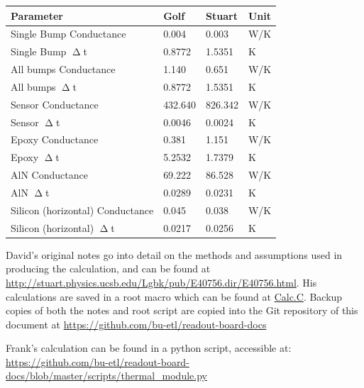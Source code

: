 \documentclass[11pt]{article}
\begin{document}
\begin{center}
  \begin{tabular}{llll}
    \textbf{Parameter}               & \textbf{Golf} & \textbf{Stuart} & \textbf{Unit} \\\midrule
    Single Bump Conductance          & 0.004         & 0.003           & W/K           \\
    Single Bump $\upDelta$t          & 0.8772        & 1.5351          & K             \\
    All bumps Conductance            & 1.140         & 0.651           & W/K           \\
    All bumps $\upDelta$t            & 0.8772        & 1.5351          & K             \\
    Sensor Conductance               & 432.640       & 826.342         & W/K           \\
    Sensor $\upDelta$t               & 0.0046        & 0.0024          & K             \\
    Epoxy Conductance                & 0.381         & 1.151           & W/K           \\
    Epoxy $\upDelta$t                & 5.2532        & 1.7379          & K             \\
    AlN Conductance                  & 69.222        & 86.528          & W/K           \\
    AlN $\upDelta$t                  & 0.0289        & 0.0231          & K             \\
    Silicon (horizontal) Conductance & 0.045         & 0.038           & W/K           \\
    Silicon (horizontal) $\upDelta$t & 0.0217        & 0.0256          & K             \\
  \end{tabular}
\end{center}

David's original notes go into detail on the methods and assumptions used in producing the calculation, and can be found at \url{http://stuart.physics.ucsb.edu/Lgbk/pub/E40756.dir/E40756.html}. His calculations are saved in a root macro which can be found at \href{http://stuart.physics.ucsb.edu/Lgbk/pub/E40756.dir/Calc.C}{Calc.C}. Backup copies of both the notes and root script are copied into the Git repository of this document at \url{https://github.com/bu-etl/readout-board-docs}

Frank's calculation can be found in a python script, accessible at: \url{https://github.com/bu-etl/readout-board-docs/blob/master/scripts/thermal_module.py}
\end{document}
